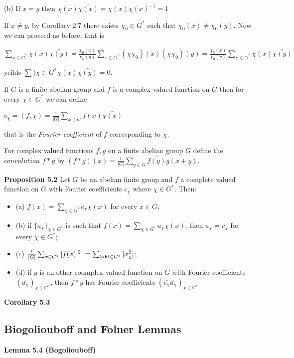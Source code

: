 \documentclass[12pt]{article}
\begin{document}
    (b) If $x = y$ then $\chi(x) \bar{\chi(x)} = \chi(x) \chi(x)^{-1} = 1$


    If $x \neq y$, by Corollary 2.7 there exists $\chi_0 \in G^*$ such that $\chi_0(x) \neq \chi_0(y)$. Now we can proceed as before,
that is


    $\sum_{x \in G^*} \chi(x) \bar{\chi(y)} = \frac{\chi_0 (x)}{\chi_0 (y)} \sum_{x \in G^*} (\chi \chi_0) (x) \bar{(\chi \chi_0)(y)} = \frac{\chi_0 (x)}{\chi_0 (y)} \sum_{\chi \in G^*} \chi(x) \bar{\chi(y)}$


yeilds $\sum){\chi \in G^*} \chi(x) \bar{\chi(y)} = 0$.


    If $G$ is a finite abelian group and $f$ is a complex valued function on $G$ then for every $\chi \in G^*$ we can define


        $c_\chi = (f,\chi) = \frac{1}{|G|} \sum_{x \in G} f(x) \bar{\chi(x)}$

    that is the \emph{Fourier coefficient} of $f$ corresponding to $\chi$.


    For complex valued functions $f,g$ on a finite abelian group $G$ define the $convolution$ 
$f * g$ by $(f * g)(x) = \frac{1}{|G|} \sum_{y \in G} \bar{f(y)} g(x + y)$.


\textbf{Proposition 5.2} Let $G$ be an abelian finite group and $f$ a complete valued function on $G$ with Fourier coefficients 
$c_\chi$ where $\chi \in G^*$. Then:

    \begin{itemize}

        \item (a) $f(x) = \sum_{\chi \in G^*} c_\chi \chi(x)$ for every $x \in G$;

        \item (b) if $\{a_\chi\}_{\chi \in G^*}$ is such that $f(x) = \sum_{\chi \in G^*} a_\chi \chi(x)$, then $a_\chi = c_\chi$ for every $\chi \in G^*$;

        \item (c) $\frac{1}{|G|} \sum_{x \in G^*} |f(x)|^2| = \sum_{\xhi \in G^*} |x_\chi^2|$; 

        \item (d) if $g$ is an other coomplex valued function on $G$ with Fourier coefficients $(d_\chi)_{\chi \in G^*}$, then $f * g$ has Fourier
        coefficients $(\bar{c_\chi} d_\chi)_{\chi \in G^*}$

    \end{itemize}


\textbf{Corollary 5.3}


\subsection{Biogoliouboff and Folner Lemmas}


\textbf{Lemma 5.4 (Bogoliouboff)}
\end{document}
